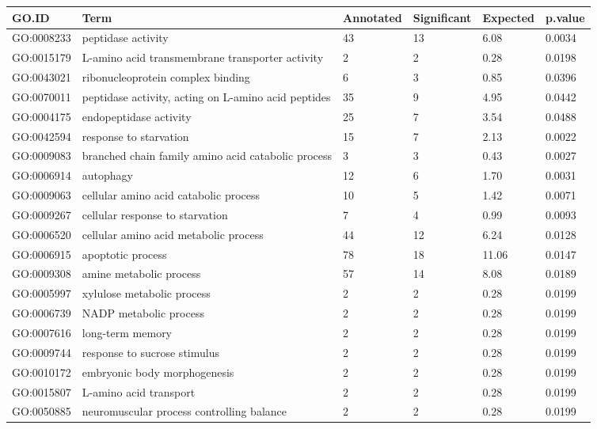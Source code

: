\documentclass[10pt]{bmc_article}
\newenvironment{bmcformat}{\begin{raggedright}\baselineskip20pt\sloppy\setboolean{publ}{false}}{\end{raggedright}\baselineskip20pt\sloppy}
\begin{document}
\begin{bmcformat}
\begin{longtable}{lp{4.5cm}llll}
 GO.ID & Term & Annotated & Significant & Expected & p.value \\ 
  \hline
GO:0008233 & peptidase activity &  43 &  13 & 6.08 & 0.0034 \\ 
  GO:0015179 & L-amino acid transmembrane transporter activity &   2 &   2 & 0.28 & 0.0198 \\ 
  GO:0043021 & ribonucleoprotein complex binding &   6 &   3 & 0.85 & 0.0396 \\ 
  GO:0070011 & peptidase activity, acting on L-amino acid peptides &  35 &   9 & 4.95 & 0.0442 \\ 
  GO:0004175 & endopeptidase activity &  25 &   7 & 3.54 & 0.0488 \\ 
   \hline
GO:0042594 & response to starvation &  15 &   7 & 2.13 & 0.0022 \\ 
  GO:0009083 & branched chain family amino acid catabolic process &   3 &   3 & 0.43 & 0.0027 \\ 
  GO:0006914 & autophagy &  12 &   6 & 1.70 & 0.0031 \\ 
  GO:0009063 & cellular amino acid catabolic process &  10 &   5 & 1.42 & 0.0071 \\ 
  GO:0009267 & cellular response to starvation &   7 &   4 & 0.99 & 0.0093 \\ 
  GO:0006520 & cellular amino acid metabolic process &  44 &  12 & 6.24 & 0.0128 \\ 
  GO:0006915 & apoptotic process &  78 &  18 & 11.06 & 0.0147 \\ 
  GO:0009308 & amine metabolic process &  57 &  14 & 8.08 & 0.0189 \\ 
  GO:0005997 & xylulose metabolic process &   2 &   2 & 0.28 & 0.0199 \\ 
  GO:0006739 & NADP metabolic process &   2 &   2 & 0.28 & 0.0199 \\ 
  GO:0007616 & long-term memory &   2 &   2 & 0.28 & 0.0199 \\ 
  GO:0009744 & response to sucrose stimulus &   2 &   2 & 0.28 & 0.0199 \\ 
  GO:0010172 & embryonic body morphogenesis &   2 &   2 & 0.28 & 0.0199 \\ 
  GO:0015807 & L-amino acid transport &   2 &   2 & 0.28 & 0.0199 \\ 
  GO:0050885 & neuromuscular process controlling balance &   2 &   2 & 0.28 & 0.0199 \\ 

\end{longtable}
\end{bmcformat}
\end{document}
